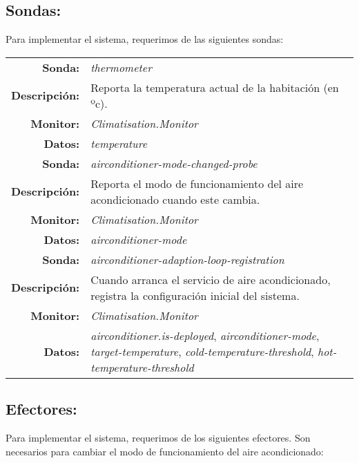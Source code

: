 \subsection{Sondas:}

Para implementar el sistema, requerimos de las siguientes sondas:

\begin{table}[htb]
  \centering

  \begin{tabular}{|r p{11.5cm}|}
    \hline
    \textbf{Sonda:} & \emph{thermometer}  \\
    \textbf{Descripción:} & Reporta la temperatura actual de la habitación (en ºc). \\
    \textbf{Monitor:} & \emph{Climatisation.Monitor} \\
    \textbf{Datos:} & \emph{temperature} \\
    \hline
    \textbf{Sonda:} & \emph{airconditioner-mode-changed-probe}  \\
    \textbf{Descripción:} & Reporta el modo de funcionamiento del aire acondicionado cuando este cambia. \\
    \textbf{Monitor:} & \emph{Climatisation.Monitor} \\
    \textbf{Datos:} & \emph{airconditioner-mode} \\
    \hline
    \textbf{Sonda:} & \emph{airconditioner-adaption-loop-registration}  \\
    \textbf{Descripción:} & Cuando arranca el servicio de aire acondicionado, registra la configuración inicial del sistema. \\
    \textbf{Monitor:} & \emph{Climatisation.Monitor} \\
    \textbf{Datos:} & \emph{airconditioner.is-deployed}, \emph{airconditioner-mode}, \emph{target-temperature}, \emph{cold-temperature-threshold}, \emph{hot-temperature-threshold} \\
    \hline
  \end{tabular}
\end{table}

\subsection{Efectores:}

Para implementar el sistema, requerimos de los siguientes efectores. Son necesarios para cambiar el modo de funcionamiento del aire acondicionado:

